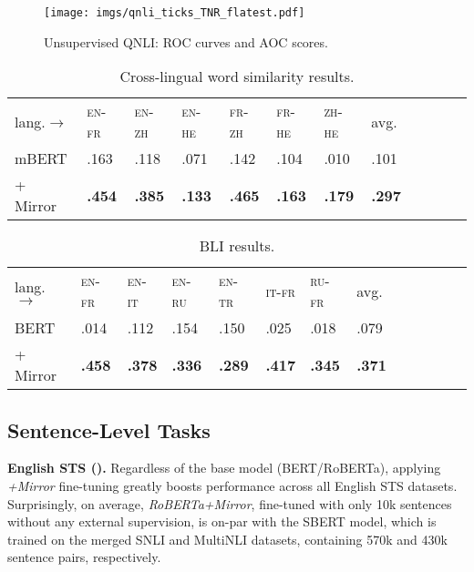 \documentclass[11pt]{article}
\newcommand{\en}{{\textsc{en}}\xspace}
\newcommand{\zh}{{\textsc{zh}}\xspace}
\newcommand{\tr}{{\textsc{tr}}\xspace}
\newcommand{\ru}{{\textsc{ru}}\xspace}
\newcommand{\fr}{{\textsc{fr}}\xspace}
\newcommand{\ita}{{\textsc{it}}\xspace}
\newcommand{\he}{{\textsc{he}}\xspace}
\begin{document}
\begin{figure}[t!]
    \centering
    \texttt{[image: imgs/qnli\_ticks\_TNR\_flatest.pdf]}
\caption{Unsupervised QNLI: ROC curves and AOC scores.}
    \label{fig:qnli}
\end{figure}
\begin{table}[!t] \centering
\setlength{\tabcolsep}{2.0pt}
\def\arraystretch{0.8}
\scriptsize
\begin{tabularx}{\linewidth}{lXXXXXXXXXXX}
\cmidrule[1.0pt]{1-10}
lang.$\rightarrow$ & \en-\fr & \en-\zh & \en-\he & \fr-\zh & \fr-\he & \zh-\he & avg.\\
\cmidrule[1.0pt]{1-10}
mBERT & .163 & .118 & .071 & .142 & .104 & .010 & .101\\
\rowcolor{blue!10}
+ Mirror  & \textbf{.454} & \textbf{.385} & \textbf{.133} & \textbf{.465} & \textbf{.163} & \textbf{.179} & \textbf{.297} \\
\cmidrule[1.0pt]{1-10}
\end{tabularx}
\caption{Cross-lingual word similarity results.}
\label{tab:ws_xling}
\end{table}
\begin{table}[!t] \centering
\setlength{\tabcolsep}{2.2pt}
\def\arraystretch{0.8}
\scriptsize
\begin{tabularx}{\linewidth}{lXXXXXXXXXXXX}
\cmidrule[1.0pt]{1-10}
lang.$\rightarrow$ & \en-\fr & \en-\ita & \en-\ru & \en-\tr & \ita-\fr & \ru-\fr & avg. \\
\cmidrule[1.0pt]{1-10}
BERT & .014 & .112 & .154 & .150 & .025 & .018 & .079 \\
\rowcolor{blue!10}
+ Mirror  & \textbf{.458} & \textbf{.378} & \textbf{.336} & \textbf{.289} & \textbf{.417} & \textbf{.345} & \textbf{.371} \\
\cmidrule[1.0pt]{1-10}
\end{tabularx}
\caption{BLI results.}
\label{tab:bli}
\end{table}



\subsection{Sentence-Level Tasks}\label{sec:sentence}




\noindent \textbf{English STS ().} Regardless of the base model (BERT/RoBERTa), applying  \textit{+Mirror} fine-tuning greatly boosts performance across all English STS datasets. Surprisingly, on average, \textit{RoBERTa+Mirror}, fine-tuned with only 10k sentences without any external supervision, is on-par with the SBERT model, which is trained on the merged SNLI \citep{bowman-etal-2015-large} and MultiNLI \citep{Williams:2018naacl} datasets, containing 570k and 430k sentence pairs, respectively. 
\end{document}
